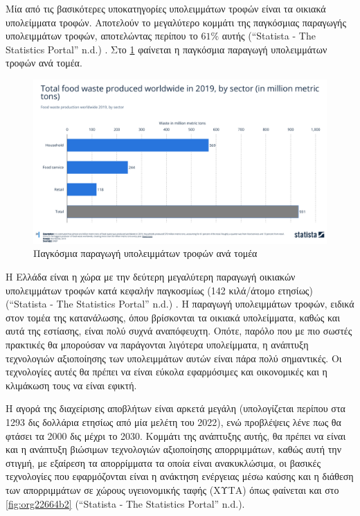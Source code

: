 \documentclass[11pt]{article}
\begin{document}
Μία από τις βασικότερες υποκατηγορίες υπολειμμάτων τροφών είναι τα οικιακά υπολείμματα τροφών. Αποτελούν το μεγαλύτερο κομμάτι της παγκόσμιας παραγωγής υπολειμμάτων τροφών, αποτελώντας περίπου το \(61 \%\) αυτής (“Statista - The Statistics Portal” n.d.) . Στο \figurename \ref{fig:org5347d6d} φαίνεται η παγκόσμια παραγωγή υπολειμμάτων τροφών ανά τομέα.
\begin{figure}[htbp]
\centering
\includegraphics[width=.9\linewidth]{../plots/statistics/statistic_food_waste_by_sector_2019.png}
\caption{\label{fig:org5347d6d}Παγκόσμια παραγωγή υπολειμμάτων τροφών ανά τομέα}
\end{figure}

Η Ελλάδα είναι η χώρα με την δεύτερη μεγαλύτερη παραγωγή οικιακών υπολειμμάτων τροφών κατά κεφαλήν παγκοσμίως (142 κιλά/άτομο ετησίως) (“Statista - The Statistics Portal” n.d.) . Η παραγωγή υπολειμμάτων τροφών, ειδικά στον τομέα της κατανάλωσης, όπου βρίσκονται τα οικιακά υπολείμματα, καθώς και αυτά της εστίασης, είναι πολύ συχνά αναπόφευχτη. Οπότε, παρόλο που με πιο σωστές πρακτικές θα μπορούσαν να παράγονται λιγότερα υπολείμματα, η ανάπτυξη τεχνολογιών αξιοποίησης των υπολειμμάτων αυτών είναι πάρα πολύ σημαντικές. Οι τεχνολογίες αυτές θα πρέπει να είναι εύκολα εφαρμόσιμες και οικονομικές και η κλιμάκωση τους να είναι εφικτή.

Η αγορά της διαχείρισης αποβλήτων είναι αρκετά μεγάλη (υπολογίζεται περίπου στα 1293 δις δολλάρια ετησίως από μία μελέτη του 2022), ενώ προβλέψεις λένε πως θα φτάσει τα 2000 δις μέχρι το 2030. Κομμάτι της ανάπτυξης αυτής, θα πρέπει να είναι και η ανάπτυξη βιώσιμων τεχνολογιών αξιοποίησης απορριμμάτων, καθώς αυτή την στιγμή, με εξαίρεση τα απορρίμματα τα οποία είναι ανακυκλώσιμα, οι βασικές τεχνολογίες που εφαρμόζονται είναι η ανάκτηση ενέργειας μέσω καύσης και η διάθεση των απορριμμάτων σε χώρους υγειονομικής ταφής (ΧΥΤΑ) όπως φαίνεται και στο \figurename  \ref{fig:org22664b2} (“Statista - The Statistics Portal” n.d.).
\end{document}
